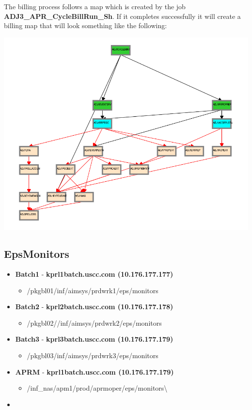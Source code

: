 \documentclass[12pt,twoside]{article}
\begin{document}
  The billing process follows a map which is created by the job \textbf{ADJ3\_APR\_CycleBillRun\_Sh}. If it completes successfully it will create a billing map that will look something like the following:


  \includegraphics[width=15.5cm]{Pictures/billing_tc_map-27124108.png}
\subsection{EpsMonitors}
\label{sec-3-10}

\begin{itemize}
\item \textbf{Batch1} - \textbf{kprl1batch.uscc.com (10.176.177.177)}
\begin{itemize}
\item \//pkgbl01\//inf\//aimsys\//prdwrk1\//eps\//monitors
\end{itemize}
\item \textbf{Batch2} - \textbf{kprl2batch.uscc.com (10.176.177.178)}
\begin{itemize}
\item \//pkgbl02\///inf\//aimsys\//prdwrk2\//eps\//monitors
\end{itemize}
\item \textbf{Batch3} - \textbf{kprl3batch.uscc.com (10.176.177.179)}
\begin{itemize}
\item \//pkgbl03\//inf\//aimsys\//prdwrk3\//eps\//monitors
\end{itemize}
\item \textbf{APRM} - \textbf{kprl1batch.uscc.com (10.176.177.179)}
\begin{itemize}
\item \//inf\_nas\//apm1\//prod\//aprmoper\//eps\//monitors\textbackslash{}
\end{itemize}
\item 
\end{itemize}
\end{document}
